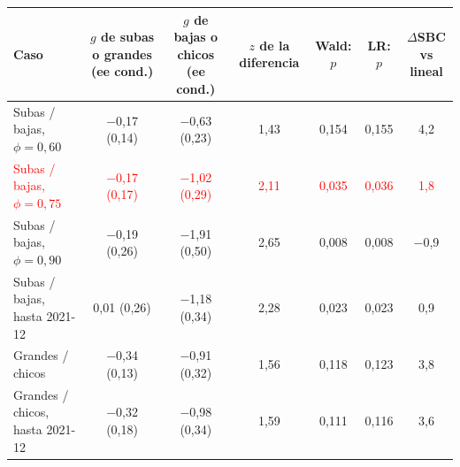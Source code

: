 \begin{tabular}{lcccccc}
\toprule
Caso & $g$ de subas o grandes (ee cond.) & $g$ de bajas o chicos (ee cond.) & $z$ de la diferencia & Wald: $p$ & LR: $p$ & $\Delta$SBC vs lineal
\\ \midrule
Subas / bajas, $\phi=0{,}60$ & \ensuremath{-}0{,}17 (0{,}14) & \ensuremath{-}0{,}63 (0{,}23) & 1{,}43 & 0{,}154 & 0{,}155 & 4{,}2 \\
\textcolor{red}{Subas / bajas, $\phi=0{,}75$} & \textcolor{red}{\ensuremath{-}0{,}17 (0{,}17)} & \textcolor{red}{\ensuremath{-}1{,}02 (0{,}29)} & \textcolor{red}{2{,}11} & \textcolor{red}{0{,}035} & \textcolor{red}{0{,}036} & \textcolor{red}{1{,}8} \\
Subas / bajas, $\phi=0{,}90$ & \ensuremath{-}0{,}19 (0{,}26) & \ensuremath{-}1{,}91 (0{,}50) & 2{,}65 & 0{,}008 & 0{,}008 & \ensuremath{-}0{,}9 \\
Subas / bajas, hasta 2021-12 & 0{,}01 (0{,}26) & \ensuremath{-}1{,}18 (0{,}34) & 2{,}28 & 0{,}023 & 0{,}023 & 0{,}9 \\
Grandes / chicos & \ensuremath{-}0{,}34 (0{,}13) & \ensuremath{-}0{,}91 (0{,}32) & 1{,}56 & 0{,}118 & 0{,}123 & 3{,}8 \\
Grandes / chicos, hasta 2021-12 & \ensuremath{-}0{,}32 (0{,}18) & \ensuremath{-}0{,}98 (0{,}34) & 1{,}59 & 0{,}111 & 0{,}116 & 3{,}6 \\
\bottomrule
\end{tabular}
